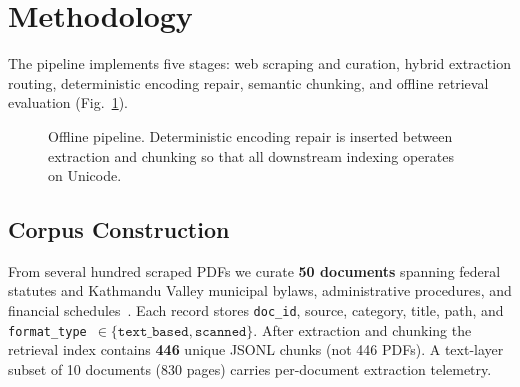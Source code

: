 \documentclass[journal]{IEEEtran}
\newcommand{\corpusDocs}{50}
\newcommand{\corpusChunks}{446}
\newcommand{\corpusSummaryDocs}{10}
\newcommand{\corpusSummaryPages}{830}
\begin{document}
\section{Methodology}
The pipeline implements five stages: web scraping and curation, hybrid extraction routing, deterministic encoding repair, semantic chunking, and offline retrieval evaluation (Fig.~\ref{fig:pipeline}).

\begin{figure}[t]
\centering
{}
\caption{Offline pipeline. Deterministic encoding repair is inserted between extraction and chunking so that all downstream indexing operates on Unicode.}
\label{fig:pipeline}
\end{figure}

\subsection{Corpus Construction}
From several hundred scraped PDFs we curate \textbf{\corpusDocs{} documents} spanning federal statutes and Kathmandu Valley municipal bylaws, administrative procedures, and financial schedules~\cite{lgoa2074}. Each record stores \texttt{doc\_id}, source, category, title, path, and \texttt{format\_type}~$\in \{\texttt{text\_based},\texttt{scanned}\}$. After extraction and chunking the retrieval index contains \textbf{\corpusChunks{}} unique JSONL chunks (not \corpusChunks{} PDFs). A text-layer subset of \corpusSummaryDocs{} documents ($\corpusSummaryPages$ pages) carries per-document extraction telemetry.
\end{document}
